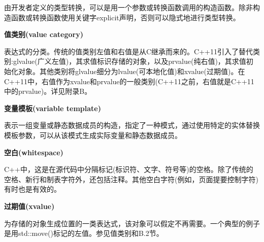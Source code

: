 由开发者定义的类型转换，可以是用一个参数或转换函数调用的构造函数。除非构造函数或转换函数使用关键字explicit声明，否则可以隐式地进行类型转换。

\noindent
\textbf{值类别(value category)}

表达式的分类。传统的值类别左值和右值是从C继承而来的。C++11引入了替代类别:glvalue(广义左值)，其求值标识存储的对象，以及prvalue(纯右值)，其求值初始化对象。其他类别将glvalue细分为lvalue(可本地化值)和xvalue(过期值)。在C++11中，右值作为xvalue和prvalue的一般类别(C++11之前，右值就是C++11中的prvalue)。详见附录B。

\noindent
\textbf{变量模板(variable template)}

表示一组变量或静态数据成员的构造，指定了一种模式，通过使用特定的实体替换模板参数，可以从该模式生成实际变量和静态数据成员。

\noindent
\textbf{空白(whitespace)}

C++中，这是在源代码中分隔标记(标识符、文字、符号等)的空格。除了传统的空格、新行和制表字符外，还包括注释。其他空白字符(例如，页面提要控制字符)有时也是有效的。

\noindent
\textbf{过期值(xvalue)}

为存储的对象生成位置的一类表达式，该对象可以假定不再需要。一个典型的例子是用std::move()标记的左值。参见值类别和B.2节。




















